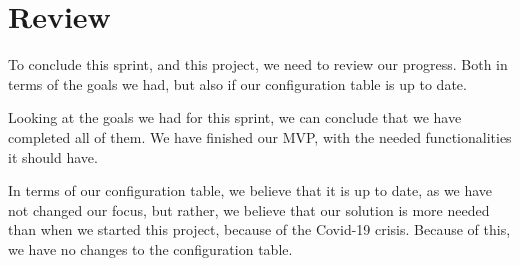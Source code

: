 \section{Review}
To conclude this sprint, and this project, we need to review our progress.
Both in terms of the goals we had, but also if our configuration table is up to date.

Looking at the goals we had for this sprint, we can conclude that we have completed all of them.
We have finished our MVP, with the needed functionalities it should have.

In terms of our configuration table, we believe that it is up to date, as we have not changed our focus, but rather, we believe that our solution is more needed than when we started this project, because of the Covid-19 crisis.
Because of this, we have no changes to the configuration table.